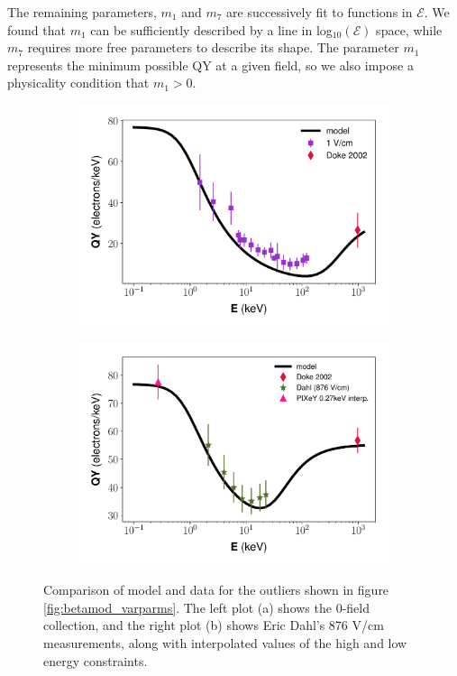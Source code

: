 The remaining parameters, $m_1$ and $m_7$ are successively fit to functions in $\mathcal{E}$. We found that $m_1$ can be sufficiently described by a line in log$_{10}(\mathcal{E})$ space, while $m_7$ requires more free parameters to describe its shape. The parameter $m_1$ represents the minimum possible QY at a given field, so we also impose a physicality condition that $m_1>0$.
\begin{figure}[!h]
\centering
\begin{subfigure}{0.5\linewidth}
\includegraphics[width=\linewidth]{Figures/Yields_fit_new/NEST_fit_1Vcm_new.pdf}
\caption{}
\end{subfigure}%
\begin{subfigure}{0.5\linewidth}
\includegraphics[width=\linewidth]{Figures/Yields_fit_new/NEST_fit_876Vcm_new.pdf}
\caption{}
\end{subfigure}
\caption{Comparison of model and data for the outliers shown in figure \ref{fig:betamod_varparms}. The left plot (a) shows the 0-field collection, and the right plot (b) shows Eric Dahl's 876 V/cm measurements, along with interpolated values of the high and low energy constraints.}
\label{fig:betamod_outliers}
\end{figure}

